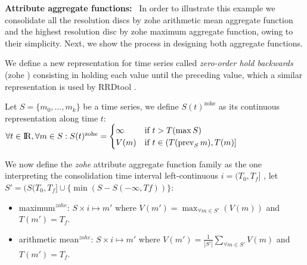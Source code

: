 \vspace{5pt} \noindent
{\bf Attribute aggregate functions:} \
In order to illustrate this example we consolidate all the resolution
discs by zohe arithmetic mean aggregate function and the highest
resolution disc by zohe maximum aggregate function, owing to their
simplicity. Next, we show the process in designing both aggregate
functions.


We define a new
representation for time series called \emph{zero-order hold backwards}
(zohe%
) consisting in holding each value until the preceding value, which a
similar representation is used by RRDtool \cite{lisa98:oetiker}.

Let $S=\{m_0,\ldots,m_k\}$ be a time series, we define
$S(t)^{\text{zohe}}$ as its continuous representation along time $t$:
$
\forall t \in \mathbb{R}  ,\forall m \in S:
S(t)^{\text{zohe}} =  
\begin{cases}
  \infty & \text{if } t > T(\max S) \\%
  V(m) & \text{if }  t\in (T(\prev_S m),T(m)]
\end{cases}
$


We now define the \emph{zohe} attribute
aggregate function family as the one interpreting the
consolidation time interval left-continuous $i=(T_0,T_f]$
%
, let $S'=(S(T_0,T_f] \cup \{\min(S-S(-\infty,Tf))\}$:
%
\begin{itemize}
\item maximum$^{zohe}$: $S \times i \mapsto m'$ where $V(m') =
  \max_{\forall m \in S'}(V(m))$ and $T(m')=T_f$.
\item arithmetic mean$^{zohe}$: $S \times i \mapsto m'$ where $V(m')
  = \frac{1}{|S'|} \sum\limits_{\forall m\in S'} V(m)$ and
  $T(m')=T_f$. 
\end{itemize}







